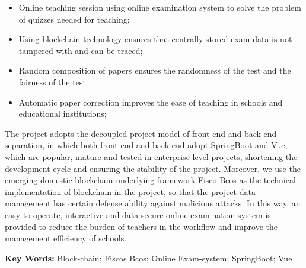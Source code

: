 \begin{itemize}
    \item Online teaching session using online examination system to solve the problem of quizzes needed for teaching;
    \item Using blockchain technology ensures that centrally stored exam data is not tampered with and can be traced;
    \item Random composition of papers ensures the randomness of the test and the fairness of the test
    \item Automatic paper correction improves the ease of teaching in schools and educational institutions;
\end{itemize}

The project adopts the decoupled project model of front-end and back-end separation, in which both front-end and back-end adopt SpringBoot and Vue, which are popular, mature and tested in enterprise-level projects, shortening the development cycle and ensuring the stability of the project. Moreover, we use the emerging domestic blockchain underlying framework Fisco Bcos as the technical implementation of blockchain in the project, so that the project data management has certain defense ability against malicious attacks. In this way, an easy-to-operate, interactive and data-secure online examination system is provided to reduce the burden of teachers in the workflow and improve the management efficiency of schools.

\vspace*{1cm}

\textbf{Key Words:} Block-chain; Fiscos Bcos; Online Exam-system; SpringBoot; Vue
